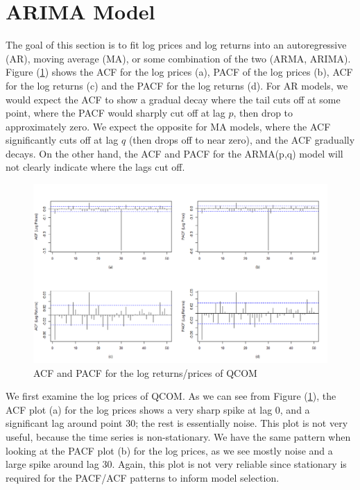 \documentclass[12pt]{article}
\begin{document}
\section*{ARIMA Model}

The goal of this section is to fit log prices and log returns into an autoregressive (AR), moving average (MA), or some combination of the two (ARMA, ARIMA). Figure (\ref{fig:acf_pacf_log_price_returns}) shows the ACF for the log prices (a), PACF of the log prices (b), ACF for the log returns (c) and the PACF for the log returns (d). For AR models, we would expect the ACF to show a gradual decay where the tail cuts off at some point, where the PACF would sharply cut off at lag $p$, then drop to approximately zero. We expect the opposite for MA models, where the ACF significantly cuts off at lag $q$ (then drops off to near zero), and the ACF gradually decays. On the other hand, the ACF and PACF for the ARMA(p,q) model will not clearly indicate where the lags cut off. 

\begin{figure}[h]
	\centering
	\includegraphics[width=1\linewidth]{plots/acf_pacf_log_price_returns.png}
	\caption{ACF and PACF for the log returns/prices of QCOM}
	\label{fig:acf_pacf_log_price_returns}
\end{figure}

We first examine the log prices of QCOM. As we can see from Figure (\ref{fig:acf_pacf_log_price_returns}), the ACF plot (a) for the log prices shows a very sharp spike at lag 0, and a significant lag around point 30; the rest is essentially noise. This plot is not very useful, because the time series is non-stationary. We have the same pattern when looking at the PACF plot (b) for the log prices, as we see mostly noise and a large spike around lag 30. Again, this plot is not very reliable since stationary is required for the PACF/ACF patterns to inform model selection. 
\end{document}
